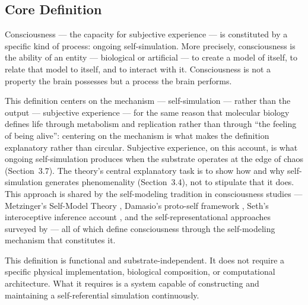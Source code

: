 \documentclass[12pt]{article}
\begin{document}
\subsection{Core Definition}


Consciousness --- the capacity for subjective experience --- is constituted by a specific kind of process: ongoing self-simulation. More precisely, consciousness is the ability of an entity --- biological or artificial --- to create a model of itself, to relate that model to itself, and to interact with it. Consciousness is not a property the brain possesses but a process the brain performs.

This definition centers on the mechanism --- self-simulation --- rather than the output --- subjective experience --- for the same reason that molecular biology defines life through metabolism and replication rather than through ``the feeling of being alive'': centering on the mechanism is what makes the definition explanatory rather than circular. Subjective experience, on this account, is what ongoing self-simulation produces when the substrate operates at the edge of chaos (Section~3.7). The theory's central explanatory task is to show how and why self-simulation generates phenomenality (Section~3.4), not to stipulate that it does. This approach is shared by the self-modeling tradition in consciousness studies --- Metzinger's Self-Model Theory \citep{Metzinger2003}, Damasio's proto-self framework \citep{Damasio1999,Damasio2010}, Seth's interoceptive inference account \citep{Seth2021}, and the self-representational approaches surveyed by \citet{Kriegel2006} --- all of which define consciousness through the self-modeling mechanism that constitutes it.

This definition is functional and substrate-independent. It does not require a specific physical implementation, biological composition, or computational architecture. What it requires is a system capable of constructing and maintaining a self-referential simulation continuously.
\end{document}
